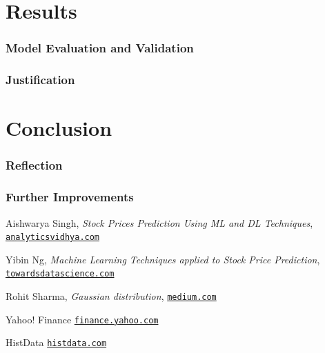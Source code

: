 \documentclass[a4paper,12pt]{article}
\begin{document}

\part{Results}
\section{Model Evaluation and Validation}
\section{Justification}


\part{Conclusion}
\section{Reflection}
\section{Further Improvements}


\pagebreak
\begin{thebibliography}{15}
	
Aishwarya Singh, \textit{Stock Prices Prediction Using ML and DL Techniques},
\texttt{\href{https://www.analyticsvidhya.com/blog/2018/10/predicting-stock-price-machine-learningnd-deep-learning-techniques-python/}{analyticsvidhya.com}}

Yibin Ng, \textit{Machine Learning Techniques applied to Stock Price Prediction}, \texttt{\href{https://towardsdatascience.com/machine-learning-techniques-applied-to-stock-price-prediction-6c1994da8001}{towardsdatascience.com}}

Rohit Sharma, \textit{Gaussian distribution}, \texttt{\href{https://medium.com/ai-techsystems/gaussian-distribution-why-is-it-important-in-data-science-and-machine-learning-9adbe0e5f8ac}{medium.com}}



Yahoo! Finance
\texttt{\href{https://finance.yahoo.com}{finance.yahoo.com}}

HistData
\texttt{\href{http://histdata.com}{histdata.com}}

\end{thebibliography}
\end{document}

